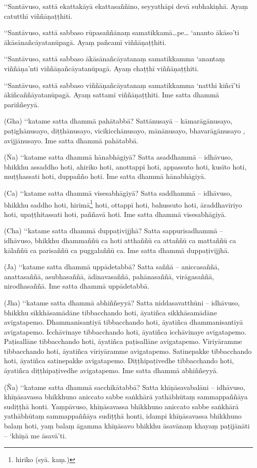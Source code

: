 ‘‘Santāvuso, sattā ekattakāyā ekattasaññino, seyyathāpi devā subhakiṇhā. Ayaṃ catutthī viññāṇaṭṭhiti.

‘‘Santāvuso, sattā sabbaso rūpasaññānaṃ samatikkamā…pe… ‘ananto ākāso’ti ākāsānañcāyatanūpagā. Ayaṃ pañcamī viññāṇaṭṭhiti.

‘‘Santāvuso, sattā sabbaso ākāsānañcāyatanaṃ samatikkamma ‘anantaṃ viññāṇa’nti viññāṇañcāyatanūpagā. Ayaṃ chaṭṭhī viññāṇaṭṭhiti.

‘‘Santāvuso, sattā sabbaso viññāṇañcāyatanaṃ samatikkamma ‘natthi kiñcī’ti ākiñcaññāyatanūpagā. Ayaṃ sattamī viññāṇaṭṭhiti. Ime satta dhammā pariññeyyā.

(Gha) ‘‘katame satta dhammā pahātabbā? Sattānusayā – kāmarāgānusayo, paṭighānusayo, diṭṭhānusayo, vicikicchānusayo, mānānusayo, bhavarāgānusayo , avijjānusayo. Ime satta dhammā pahātabbā.

(Ṅa) ‘‘katame satta dhammā hānabhāgiyā? Satta asaddhammā – idhāvuso, bhikkhu assaddho hoti, ahiriko hoti, anottappī hoti, appassuto hoti, kusīto hoti, muṭṭhassati hoti, duppañño hoti. Ime satta dhammā hānabhāgiyā.

(Ca) ‘‘katame satta dhammā visesabhāgiyā? Satta saddhammā – idhāvuso, bhikkhu saddho hoti, hirimā\footnote{hiriko (syā. kaṃ.)} hoti, ottappī hoti, bahussuto hoti, āraddhavīriyo hoti, upaṭṭhitassati hoti, paññavā hoti. Ime satta dhammā visesabhāgiyā.

(Cha) ‘‘katame satta dhammā duppaṭivijjhā? Satta sappurisadhammā – idhāvuso, bhikkhu dhammaññū ca hoti atthaññū ca attaññū ca mattaññū ca kālaññū ca parisaññū ca puggalaññū ca. Ime satta dhammā duppaṭivijjhā.

(Ja) ‘‘katame satta dhammā uppādetabbā? Satta saññā – aniccasaññā, anattasaññā, asubhasaññā, ādīnavasaññā, pahānasaññā, virāgasaññā, nirodhasaññā. Ime satta dhammā uppādetabbā.

(Jha) ‘‘katame satta dhammā abhiññeyyā? Satta niddasavatthūni – idhāvuso, bhikkhu sikkhāsamādāne tibbacchando hoti, āyatiñca sikkhāsamādāne avigatapemo. Dhammanisantiyā tibbacchando hoti, āyatiñca dhammanisantiyā avigatapemo. Icchāvinaye tibbacchando hoti, āyatiñca icchāvinaye avigatapemo. Paṭisallāne tibbacchando hoti, āyatiñca paṭisallāne avigatapemo. Vīriyāramme tibbacchando hoti, āyatiñca vīriyāramme avigatapemo. Satinepakke tibbacchando hoti, āyatiñca satinepakke avigatapemo. Diṭṭhipaṭivedhe tibbacchando hoti, āyatiñca diṭṭhipaṭivedhe avigatapemo. Ime satta dhammā abhiññeyyā.

(Ña) ‘‘katame satta dhammā sacchikātabbā? Satta khīṇāsavabalāni – idhāvuso, khīṇāsavassa bhikkhuno aniccato sabbe saṅkhārā yathābhūtaṃ sammappaññāya sudiṭṭhā honti. Yaṃpāvuso, khīṇāsavassa bhikkhuno aniccato sabbe saṅkhārā yathābhūtaṃ sammappaññāya sudiṭṭhā honti, idampi khīṇāsavassa bhikkhuno balaṃ hoti, yaṃ balaṃ āgamma khīṇāsavo bhikkhu āsavānaṃ khayaṃ paṭijānāti – ‘khīṇā me āsavā’ti.

